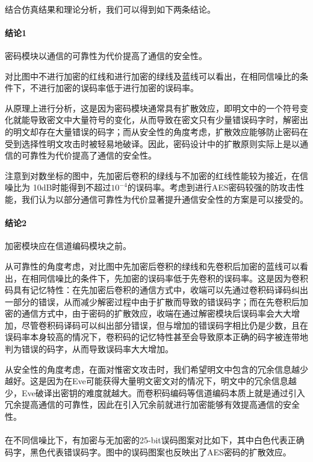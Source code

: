 \paragraph{}结合仿真结果和理论分析，我们可以得到如下两条结论。

\paragraph{结论1}密码模块以通信的可靠性为代价提高了通信的安全性。

对比图中不进行加密的红线和进行加密的绿线及蓝线可以看出，在相同信噪比的条件下，不进行加密的误码率低于进行加密的误码率。

从原理上进行分析，这是因为密码模块通常具有扩散效应，即明文中的一个符号变化就能导致密文中大量符号的变化，从而导致在密文只有少量错误码字时，解密出的明文却存在大量错误的码字；而从安全性的角度考虑，扩散效应能够防止密码在受到选择性明文攻击时被轻易地破译。因此，密码设计中的扩散原则实际上是以通信的可靠性为代价提高了通信的安全性。

注意到对数坐标的图中，先加密后卷积的绿线与不加密的红线性能较为接近，在信噪比为 10dB时能得到不超过$10^{-4}$的误码率。考虑到进行AES密码较强的防攻击性能，我们认为以部分通信可靠性为代价显著提升通信安全性的方案是可以接受的。

\paragraph{结论2}加密模块应在信道编码模块之前。

从可靠性的角度考虑，对比图中先加密后卷积的绿线和先卷积后加密的蓝线可以看出，在相同信噪比的条件下，先加密的误码率低于先卷积的误码率。这是因为卷积码具有记忆特性：在先加密后卷积的通信方式中，收端可以先通过卷积码译码纠出一部分的错误，从而减少解密过程中由于扩散而导致的错误码字；而在先卷积后加密的通信方式中，由于密码的扩散效应，收端在通过解密模块后误码率会大大增加，尽管卷积码译码可以纠出部分错误，但与增加的错误码字相比仍是少数，且在误码率本身较高的情况下，卷积码的记忆特性甚至会导致原本正确的码字被连带地判为错误的码字，从而导致误码率大大增加。

从安全性的角度考虑，在面对惟密文攻击时，我们希望明文中包含的冗余信息越少越好。这是因为在Eve可能获得大量明文密文对的情况下，明文中的冗余信息越少，Eve破译出密钥的难度就越大。而卷积码编码等信道编码本质上就是通过引入冗余提高通信的可靠性，因此在引入冗余前就进行加密能够有效提高通信的安全性。

\paragraph{}
在不同信噪比下，有加密与无加密的25-bit误码图案对比如下，其中白色代表正确码字，黑色代表错误码字。图中的误码图案也反映出了AES密码的扩散效应。

